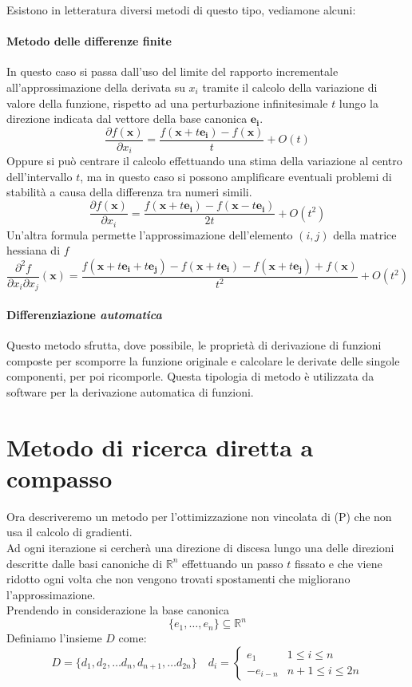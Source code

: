 Esistono in letteratura diversi metodi di questo tipo, vediamone alcuni:
 \paragraph{Metodo delle differenze finite}
In questo caso si passa dall'uso del limite del rapporto incrementale all'approssimazione
della derivata su $x_i$ tramite il calcolo della variazione di valore
della funzione, rispetto ad una perturbazione infinitesimale $t$ lungo
la direzione indicata dal vettore della base canonica $\mathbf{e_i}$.
 $$ \frac{\partial f(\mathbf{x})}{\partial x_i} = 
  \frac{f(\mathbf{x}+ t \mathbf{e_i})- f(\mathbf{x})}{t} + O(t) $$
Oppure si può centrare il calcolo effettuando una stima della
variazione al centro dell'intervallo $t$, ma in questo caso si possono
amplificare eventuali problemi di stabilità a causa della differenza
tra numeri simili.
 $$ \frac{\partial f(\mathbf{x})}{\partial x_i} = 
  \frac{f(\mathbf{x}+ t \mathbf{e_i})- f(\mathbf{x} -
t\mathbf{e_i})}{2t} + O(t^2) $$ Un'altra formula permette
l'approssimazione dell'elemento $(i,j)$ della matrice hessiana di $f$
 $$ \frac{\partial^2 f}{\partial x_i\partial x_j}(\mathbf{x}) = 
  \frac{f(\mathbf{x}+ t \mathbf{e_i} + t\mathbf{e_j})- f(\mathbf{x}+
    t\mathbf{e_i}) - f(\mathbf{x} + t\mathbf{e_j}) + f(\mathbf{x})}{t^2} +
O(t^2) $$

\paragraph{Differenziazione \emph{automatica}}
Questo metodo sfrutta, dove possibile, le propriet\`a di derivazione di
funzioni composte per scomporre la funzione originale e calcolare le
derivate delle singole componenti, per poi ricomporle. Questa
tipologia di metodo \`e utilizzata da software per la derivazione
automatica di funzioni.
 
\section{Metodo di ricerca diretta a compasso}

Ora descriveremo un metodo per l'ottimizzazione non vincolata di (P)
che non usa il calcolo di gradienti.\\ Ad ogni iterazione si cercher\`a
una direzione di discesa lungo una delle direzioni descritte dalle
basi canoniche di $\mathbb{R}^n$ effettuando un passo $t$ fissato e
che viene ridotto ogni volta che non vengono trovati spostamenti che
migliorano l'approssimazione.  \\ Prendendo in considerazione la base
canonica
 $$ \{e_1, \ldots, e_n  \} \subseteq \mathbb{R}^{n} $$
Definiamo l'insieme $D$ come:
$$D = \{ d_1, d_2, \ldots d_n, d_{n+1}, \ldots d_{2n}\} \quad
 d_i = \left\{
\begin{array}{ll} e_1 & 1 \leq i \leq n \\ -e_{i-n} & n+1 \leq i \leq
2n
\end{array} \right.
$$

